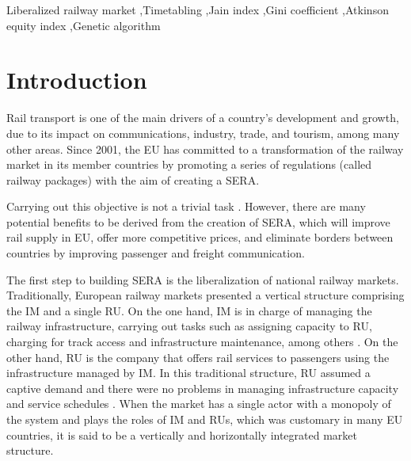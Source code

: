 \documentclass[preprint,12pt]{elsarticle}
\begin{document}
\begin{frontmatter}
\begin{highlights}
\end{highlights}


\begin{keyword}
Liberalized railway market \sep Timetabling \sep Jain index \sep Gini coefficient \sep Atkinson equity index \sep Genetic algorithm


\end{keyword}


\end{frontmatter}

\section{Introduction}
Rail transport is one of the main drivers of a country's development and growth, due to its impact on communications, industry, trade, and tourism, among many other areas. Since 2001, the \gls{EU} has committed to a transformation of the railway market in its member countries by promoting a series of regulations (called railway packages) with the aim of creating a \gls{SERA}\cite{COM2011}.

Carrying out this objective is not a trivial task \cite{Ait2021, Yao2024Bi-objectiveLine}. However, there are many potential benefits to be derived from the creation of \gls{SERA}, which will improve rail supply in \gls{EU}, offer more competitive prices, and eliminate borders between countries by improving passenger and freight communication.

The first step to building \gls{SERA} is the liberalization of national railway markets. Traditionally, European railway markets presented a vertical structure comprising the \gls{IM} and a single \gls{RU}. On the one hand, \gls{IM} is in charge of managing the railway infrastructure, carrying out tasks such as assigning capacity to \gls{RU}, charging for track access and infrastructure maintenance, among others \cite{Pena2015}. On the other hand, \gls{RU} is the company that offers rail services to passengers using the infrastructure managed by \gls{IM}. In this traditional structure, \gls{RU} assumed a captive demand and there were no problems in managing infrastructure capacity and service schedules \cite{Besinovic2024}. When the market has a single actor with a monopoly of the system and plays the roles of \gls{IM} and \glspl{RU}, which was customary in many \gls{EU} countries, it is said to be a vertically and horizontally integrated market structure.
\end{document}
